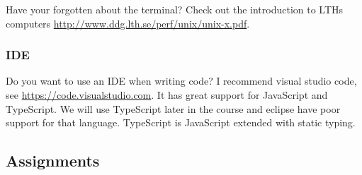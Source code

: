\documentclass[fleqn, article, a4paper]{memoir}
\begin{document}
\noindent Have your forgotten about the terminal? Check out the introduction to LTHs computers \url{http://www.ddg.lth.se/perf/unix/unix-x.pdf}.

\subsubsection*{IDE}

\noindent Do you want to use an IDE when writing code? I recommend visual studio code, see \url{https://code.visualstudio.com}. It has great support for JavaScript and TypeScript. We will use TypeScript later in the course and eclipse have poor support for that language. TypeScript is JavaScript extended with static typing.

\subsection*{Assignments}
\end{document}
